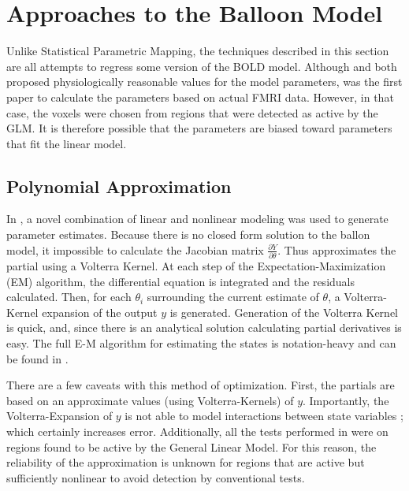 \section{Approaches to the Balloon Model}
Unlike Statistical Parametric Mapping, the techniques described in this
section are all attempts to regress some version of the BOLD model. 
Although \cite{Buxton1998} and \cite{Friston2000}
both proposed physiologically reasonable values for the model parameters, 
\cite{Friston2002b} was the first paper to calculate the parameters based 
on actual FMRI data. However, in that case, the voxels were chosen from
regions that were detected as active by the GLM. It is therefore possible
that the parameters are biased toward parameters that fit the linear model.

\subsection{Polynomial Approximation}
\label{sec:Background Linear Approximation}
In \cite{Friston2002b}, a novel combination of linear and nonlinear modeling
was used to generate parameter estimates. Because there is no closed 
form solution to the ballon model, it impossible to 
calculate the Jacobian matrix $\frac{\partial Y}{\partial \theta}$. Thus 
\cite{Friston2002b} approximates the partial using a Volterra Kernel. 
At each step of the Expectation-Maximization (EM) algorithm, 
the differential equation is integrated and the residuals
calculated. Then, for each $\theta_i$ surrounding the current estimate of 
$\theta$, a Volterra-Kernel expansion of the output $y$ is generated. Generation
of the Volterra Kernel is quick, and, since there
is an analytical solution calculating partial derivatives is easy. 
 The full E-M algorithm
for estimating the states is notation-heavy and can be found in \cite{Friston2002b}.

There are a few caveats with this method of optimization. First, the 
partials are based on an approximate values (using Volterra-Kernels) of $y$.
Importantly, the Volterra-Expansion of $y$ is not able to model interactions
between state variables \cite{Friston2002b}; which certainly increases error.
Additionally, all the tests performed
in \cite{Friston2002b} were on regions found to be active by the General
Linear Model. For this reason, the reliability of the approximation is unknown
for regions that are active but
sufficiently nonlinear to avoid detection by conventional tests.

